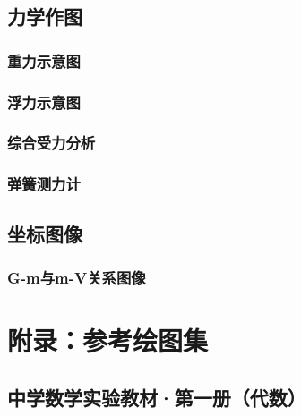 \chapter{力学作图}

\section{重力示意图}


\section{浮力示意图}


\section{综合受力分析}


\section{弹簧测力计}


\chapter{坐标图像}

\section{G-m与m-V关系图像}


\appendix
\part{附录：参考绘图集}



\chapter{中学数学实验教材·第一册（代数）}


